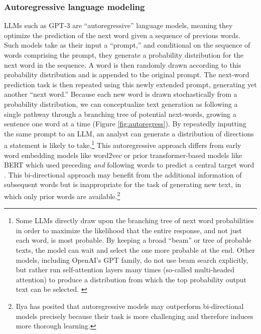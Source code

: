 \documentclass{article}
\begin{document}
\subsubsection*{Autoregressive language modeling}

LLMs such as GPT-3 are ``autoregressive'' language models, meaning they
optimize the prediction of the next word given a sequence of previous
words. Such models take as their input a ``prompt,'' and conditional on
the sequence of words comprising the prompt, they generate a probability
distribution for the next word in the sequence. A word is then randomly
drawn according to this probability distribution and is appended to the
original prompt. The next-word prediction task is then repeated using
this newly extended prompt, generating yet another ``next word.''
Because each new word is drawn stochastically from a probability
distribution, we can conceptualize text generation as following a single
pathway through a branching tree of potential next-words, growing a
sentence one word at a time (Figure \ref{fig:autoregress}). By repeatedly inputting the same
prompt to an LLM, an analyst can generate a distribution of directions a
statement is likely to take.\footnote{Some LLMs directly draw upon the
  branching tree of next word probabilities in order to maximize the
  likelihood that the entire response, and not just each word, is most
  probable. By keeping a broad ``beam'' or tree of probable texts, the
  model can wait and select the one more probable at the end. Other
  models, including OpenAI's GPT family, do not use beam search
  explicitly, but rather run self-attention layers many times (so-called
  multi-headed attention) to produce a distribution from which the top
  probability output text can be selected. \hl{}} This autoregressive
approach differs from early word embedding models like word2vec or prior
transformer-based models like BERT which used preceding \emph{and}
following words to predict a central target word
\parencite{Devlin2018-um, Mikolov2013-va}. This bi-directional approach may benefit from the
additional information of subsequent words but is inappropriate for the
task of generating new text, in which only prior words are
available.\footnote{Ilya \citet{Sutskever2023-sa} has
  posited that autoregressive models may outperform bi-directional
  models precisely because their task is more challenging and therefore
  induces more thorough learning.}
\end{document}
